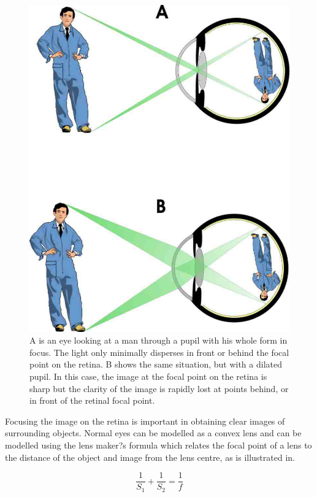 \begin{figure}[!ht]
\centering
  \includegraphics{figures/light_path}
\caption{A is an eye looking at a man through a pupil with his whole form in focus.
		The light only minimally disperses in front or behind the focal point
		on the retina. B shows the same situation, but with a dilated pupil.
		In this case, the image at the focal point on the retina is sharp but
		the clarity of the image is rapidly lost at points behind, or in front
		of the retinal focal point.}
\label{fig:light_journey}
\end{figure}

Focusing the image on the retina is important in obtaining clear images of
surrounding objects. Normal eyes can be modelled as a convex lens and
can be modelled using the lens maker?s formula
which relates the focal point of a lens to the distance of the object and
image from the lens centre, as is illustrated in.

\begin{equation}
\frac{1}{S_1} + \frac{1}{S_2} = \frac{1}{f}
\label{eq:lens_makers}
\end{equation}

